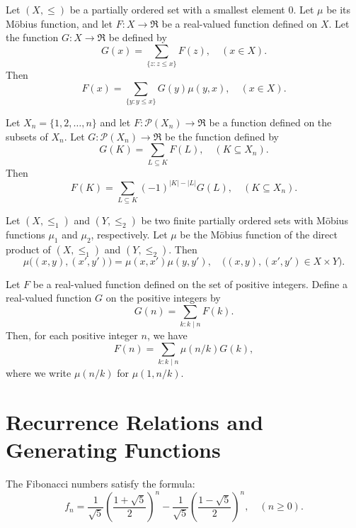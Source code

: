 \begin{theorem}
    \label{thm:6.6.1}
Let $(X, \leq)$ be a partially ordered set with a smallest element $0$. Let $\mu$ be its Möbius function, and let $F : X \to \Re$ be a real-valued function defined on $X$. Let the function $G : X \to \Re$ be defined by
\[
G(x) = \sum_{\{z : z \leq x\}} F(z), \quad (x \in X).
\]
Then
\[
F(x) = \sum_{\{y : y \leq x\}} G(y) \mu(y, x), \quad (x \in X).
\]
\end{theorem}

\begin{corollary}
    \label{cor: 6.6.2}
Let $X_n = \{1, 2, \ldots, n\}$ and let $F : \mathcal{P}(X_n) \to \Re$ be a function defined on the subsets of $X_n$. Let $G : \mathcal{P}(X_n) \to \Re$ be the function defined by
\[
G(K) = \sum_{L \subseteq K} F(L), \quad (K \subseteq X_n).
\]
Then
\[
F(K) = \sum_{L \subseteq K} (-1)^{|K| - |L|} G(L), \quad (K \subseteq X_n).
\]
\end{corollary}

\begin{theorem}
    \label{thm:6.6.3}
Let $(X, \leq_1)$ and $(Y, \leq_2)$ be two finite partially ordered sets with Möbius functions $\mu_1$ and $\mu_2$, respectively. Let $\mu$ be the Möbius function of the direct product of $(X, \leq_1)$ and $(Y, \leq_2)$. Then
\[
\mu\big((x, y), (x', y')\big) = \mu(x, x') \mu(y, y'), \quad \big((x, y), (x', y') \in X \times Y\big).
\tag{6.29}
\]
\end{theorem}

\begin{theorem}
    \label{thm:6.6.4}
Let $F$ be a real-valued function defined on the set of positive integers. Define a real-valued function $G$ on the positive integers by
\[
G(n) = \sum_{k : k \mid n} F(k).
\]
Then, for each positive integer $n$, we have
\[
F(n) = \sum_{k : k \mid n} \mu\left(n/k \right) G(k),
\]
where we write $\mu(n/k)$ for $\mu(1, n/k)$.
\end{theorem}

\chapter{Recurrence Relations and Generating Functions}
\begin{theorem}
 \label{thm:7.1.1}
The Fibonacci numbers satisfy the formula:
\[
f_n = \frac{1}{\sqrt{5}} \left( \frac{1 + \sqrt{5}}{2} \right)^n - \frac{1}{\sqrt{5}} \left( \frac{1 - \sqrt{5}}{2} \right)^n, \quad (n \geq 0).\tag{7.8}
\]
\end{theorem}



